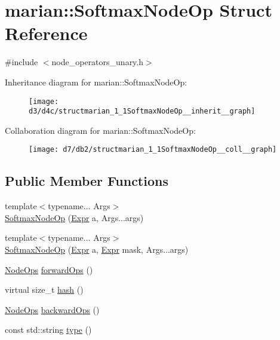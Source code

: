 \hypertarget{structmarian_1_1SoftmaxNodeOp}{}\section{marian\+:\+:Softmax\+Node\+Op Struct Reference}
\label{structmarian_1_1SoftmaxNodeOp}


{\ttfamily \#include $<$node\+\_\+operators\+\_\+unary.\+h$>$}



Inheritance diagram for marian\+:\+:Softmax\+Node\+Op\+:
\nopagebreak
\begin{figure}[H]
\begin{center}
\leavevmode
\texttt{[image: d3/d4c/structmarian\_1\_1SoftmaxNodeOp\_\_inherit\_\_graph]}
\end{center}
\end{figure}


Collaboration diagram for marian\+:\+:Softmax\+Node\+Op\+:
\nopagebreak
\begin{figure}[H]
\begin{center}
\leavevmode
\texttt{[image: d7/db2/structmarian\_1\_1SoftmaxNodeOp\_\_coll\_\_graph]}
\end{center}
\end{figure}
\subsection*{Public Member Functions}
\begin{DoxyCompactItemize}
\item 
{\footnotesize template$<$typename... Args$>$ }\\\hyperlink{structmarian_1_1SoftmaxNodeOp_a1eae47fdce259a30afc6aff84c3566ae}{Softmax\+Node\+Op} (\hyperlink{namespacemarian_a498d8baf75b754011078b890b39c8e12}{Expr} a, Args...\+args)
\item 
{\footnotesize template$<$typename... Args$>$ }\\\hyperlink{structmarian_1_1SoftmaxNodeOp_ad61d27e7c9d9b2782b0cf1f0e910fef4}{Softmax\+Node\+Op} (\hyperlink{namespacemarian_a498d8baf75b754011078b890b39c8e12}{Expr} a, \hyperlink{namespacemarian_a498d8baf75b754011078b890b39c8e12}{Expr} mask, Args...\+args)
\item 
\hyperlink{namespacemarian_a4956376218cc236016c20bc4071470da}{Node\+Ops} \hyperlink{structmarian_1_1SoftmaxNodeOp_ac840d869fb28c00f91bab78b04012e42}{forward\+Ops} ()
\item 
virtual size\+\_\+t \hyperlink{structmarian_1_1SoftmaxNodeOp_a97692b03bf740a4759f906303bbfd2e1}{hash} ()
\item 
\hyperlink{namespacemarian_a4956376218cc236016c20bc4071470da}{Node\+Ops} \hyperlink{structmarian_1_1SoftmaxNodeOp_a60b215754e045ea3442cb8bb1ba26465}{backward\+Ops} ()
\item 
const std\+::string \hyperlink{structmarian_1_1SoftmaxNodeOp_aa6282d5e41f36d4de1144db398308723}{type} ()
\end{DoxyCompactItemize}

